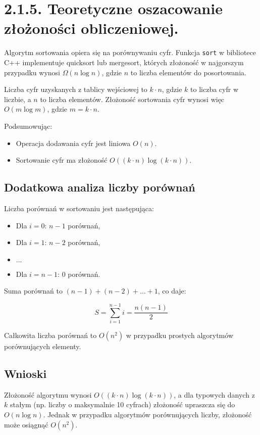 \documentclass[a4paper,12pt]{article}
\begin{document}
	\section{2.1.5. Teoretyczne oszacowanie złożoności obliczeniowej.}
	
	Algorytm sortowania opiera się na porównywaniu cyfr. Funkcja \texttt{sort} w bibliotece C++ implementuje quicksort lub mergesort, których złożoność w najgorszym przypadku wynosi $\Omega(n \log n)$, gdzie $n$ to liczba elementów do posortowania.
	
	Liczba cyfr uzyskanych z tablicy wejściowej to $k \cdot n$, gdzie $k$ to liczba cyfr w liczbie, a $n$ to liczba elementów. Złożoność sortowania cyfr wynosi więc $O(m \log m)$, gdzie $m = k \cdot n$.
	
	Podsumowując:
	\begin{itemize}
		\item Operacja dodawania cyfr jest liniowa $O(n)$.
		\item Sortowanie cyfr ma złożoność $O((k \cdot n) \log (k \cdot n))$.
	\end{itemize}
	
	\subsection{Dodatkowa analiza liczby porównań}
	
	Liczba porównań w sortowaniu jest następująca:
	\begin{itemize}
		\item Dla $i = 0$: $n-1$ porównań,
		\item Dla $i = 1$: $n-2$ porównań,
		\item $\dots$
		\item Dla $i = n-1$: $0$ porównań.
	\end{itemize}
	
	Suma porównań to $(n-1) + (n-2) + \dots + 1$, co daje:
	
	\[
	S = \sum_{i=1}^{n-1} i = \frac{n(n-1)}{2}
	\]
	
	Całkowita liczba porównań to $O(n^2)$ w przypadku prostych algorytmów porównujących elementy.
	
	\subsection{Wnioski}
	
	Złożoność algorytmu wynosi $O((k \cdot n) \log (k \cdot n))$, a dla typowych danych z $k$ stałym (np. liczby o maksymalnie 10 cyfrach) złożoność upraszcza się do $O(n \log n)$. Jednak w przypadku algorytmów porównujących liczby, złożoność może osiągnąć $O(n^2)$.
	\newpage
\end{document}
